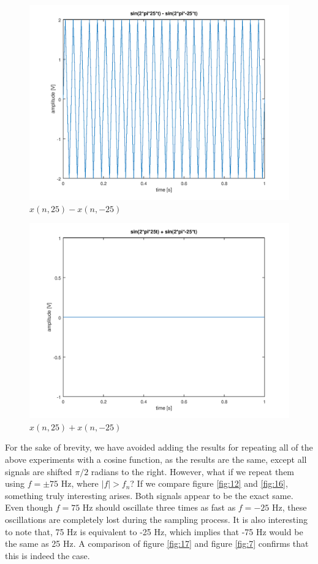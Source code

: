 \documentclass[a4paper, 12pt]{report}
\begin{document}
			\begin{figure}[H]
				\label{fig:14}
				\includegraphics[width=\textwidth]{img/1_14_diff.png}
				\caption{$x(n, 25) - x(n, -25)$}
			\end{figure}

			\begin{figure}[H]
				\label{fig:15}
				\includegraphics[width=\textwidth]{img/1_15_cancel.png}
				\caption{$x(n, 25) + x(n, -25)$}
			\end{figure}

			For the sake of brevity, we have avoided adding the results for repeating all of the above experiments with a cosine function, as the results are the same, except all signals are shifted $\pi/2$ radians to the right. However, what if we repeat them using $f=\pm75$ Hz, where $|f| > f_n$? If we compare figure \ref{fig:12} and \ref{fig:16}, something truly interesting arises. Both signals appear to be the exact same. Even though $f=75$ Hz should oscillate three times as fast as $f=-25$ Hz, these oscillations are completely lost during the sampling process. It is also interesting to note that, 75 Hz is equivalent to -25 Hz, which implies that -75 Hz would be the same as 25 Hz. A comparison of figure \ref{fig:17} and figure \ref{fig:7} confirms that this is indeed the case.
\end{document}
